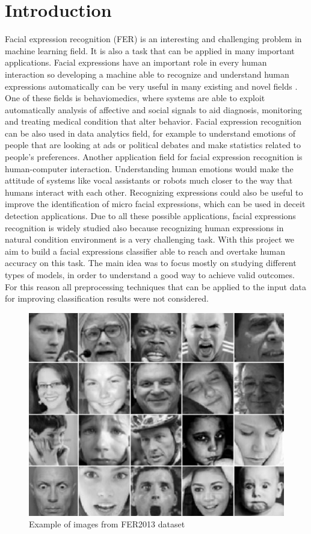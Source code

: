\documentclass[10pt,twocolumn,letterpaper]{article}
\begin{document}
\section{Introduction}
Facial expression recognition (FER) is an interesting and challenging problem in machine learning field. It is also a task that can be applied in many important applications. Facial expressions have an important role in every human interaction so developing a machine able to recognize and understand human expressions automatically can be very useful in many existing and novel fields \cite{2}. \\
One of these fields is behaviomedics, where systems are able to exploit automatically analysis of affective and social signals to aid diagnosis, monitoring and treating medical condition that alter behavior. Facial expression recognition can be also used in data analytics field, for example to understand emotions of people that are looking at ads or political debates and make statistics related to people's preferences. Another application field for facial expression recognition is human-computer interaction. Understanding human emotions would make the attitude of systems like vocal assistants or robots much closer to the way that humans interact with each other. Recognizing expressions could also be useful to improve the identification of micro facial expressions, which can be used in deceit detection applications. Due to all these possible applications, facial expressions recognition is widely studied also because recognizing human expressions in natural condition environment is a very challenging task. With this project we aim to build a facial expressions classifier able to reach and overtake human accuracy on this task. The main idea was to focus mostly on studying different types of models, in order to understand a good way to achieve valid outcomes. For this reason all preprocessing techniques that can be applied to the input data for improving classification results were not considered.
\begin{figure}[H]
   \centering
   \includegraphics[width=0.8\linewidth]{./immagini/dataset.jpeg}
   \caption{Example of images from FER2013 dataset}
   \label{figure:imagesfer}
\end{figure}
\end{document}
